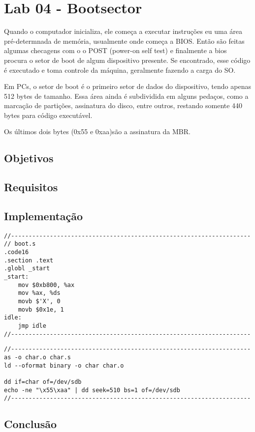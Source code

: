 \chapter{Lab 04 - Bootsector}

Quando o computador inicializa, ele começa a executar instruções eu uma área pré-determnada de memória, usualmente onde começa a BIOS. Então são feitas algumas checagens com o o POST (power-on self test) e finalmente a bios procura o setor de boot de algum dispositivo presente. Se encontrado, esse código é executado e toma controle da máquina, geralmente fazendo a carga do SO.

Em PCs, o setor de boot é o primeiro setor de dados do dispositivo, tendo apenas 512 bytes de tamanho. Essa área ainda é subdividida em alguns pedaços, como a marcação de partições, assinatura do disco, entre outros, restando somente 440 bytes para código executável.

Os últimos dois bytes (0x55 e 0xaa)são a assinatura da MBR.

\section{Objetivos}

\section{Requisitos}

\section{Implementação}

\begin{espacosimples}
\begin{verbatim}
//--------------------------------------------------------------------
// boot.s
.code16
.section .text
.globl _start
_start:
    mov $0xb800, %ax
    mov %ax, %ds
    movb $'X', 0
    movb $0x1e, 1
idle:
    jmp idle
//--------------------------------------------------------------------
\end{verbatim}
\end{espacosimples}

\begin{espacosimples}
\begin{verbatim}
//--------------------------------------------------------------------
as -o char.o char.s
ld --oformat binary -o char char.o

dd if=char of=/dev/sdb
echo -ne "\x55\xaa" | dd seek=510 bs=1 of=/dev/sdb
//--------------------------------------------------------------------
\end{verbatim}
\end{espacosimples}

\section{Conclusão}

